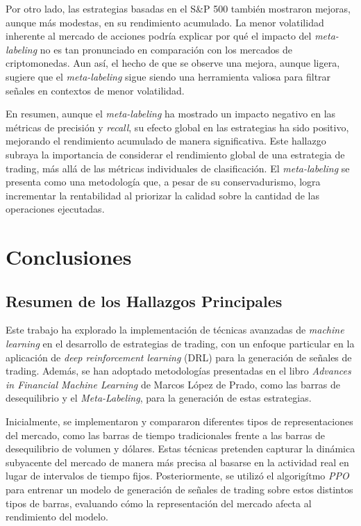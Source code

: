 \documentclass[a4paper,12pt, twoside]{report}
\begin{document}
Por otro lado, las estrategias basadas en el S\&P 500 también mostraron mejoras, aunque más modestas, 
en su rendimiento acumulado. La menor volatilidad inherente al mercado de acciones podría explicar 
por qué el impacto del \textit{meta-labeling} no es tan pronunciado en comparación con los mercados 
de criptomonedas. Aun así, el hecho de que se observe una mejora, aunque ligera, sugiere que el 
\textit{meta-labeling} sigue siendo una herramienta valiosa para filtrar señales en contextos 
de menor volatilidad.

En resumen, aunque el \textit{meta-labeling} ha mostrado un impacto negativo en las métricas 
de precisión y \textit{recall}, su efecto global en las estrategias ha sido positivo, 
mejorando el rendimiento acumulado de manera significativa. Este hallazgo subraya la 
importancia de considerar el rendimiento global de una estrategia de trading, más allá de 
las métricas individuales de clasificación. El \textit{meta-labeling} se presenta como una 
metodología que, a pesar de su conservadurismo, logra incrementar la rentabilidad al priorizar 
la calidad sobre la cantidad de las operaciones ejecutadas.


\chapter{Conclusiones}

\section{Resumen de los Hallazgos Principales}


Este trabajo ha explorado la implementación de técnicas avanzadas de \textit{machine learning} 
en el desarrollo de estrategias de trading, con un enfoque particular en la aplicación de 
\textit{deep reinforcement learning} (DRL) para la generación de señales de trading. Además, 
se han adoptado metodologías presentadas en el libro \textit{Advances in Financial Machine Learning} 
de Marcos López de Prado, como las barras de desequilibrio y el \textit{Meta-Labeling}, para 
la generación de estas estrategias.

Inicialmente, se implementaron y compararon diferentes tipos de representaciones del mercado, 
como las barras de tiempo tradicionales frente a las barras de desequilibrio de volumen y dólares. 
Estas técnicas pretenden capturar la dinámica subyacente del mercado de manera más precisa al 
basarse en la actividad real en lugar de intervalos de tiempo fijos. Posteriormente, se 
utilizó el algorigítmo \textit{PPO} para entrenar un modelo de generación de señales de trading sobre estos distintos 
tipos de barras, evaluando cómo la representación del mercado afecta al rendimiento del modelo.
\end{document}
